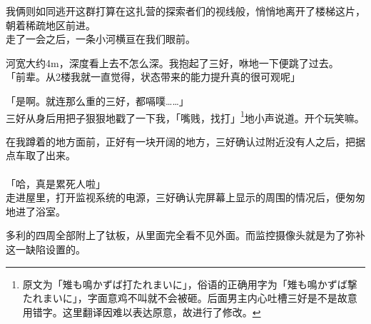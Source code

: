 我俩则如同逃开这群打算在这扎营的探索者们的视线般，悄悄地离开了楼梯这片，朝着稀疏地区前进。\\

走了一会之后，一条小河横亘在我们眼前。

河宽大约4m，深度看上去不怎么深。我抱起了三好，咻地一下便跳了过去。\\

「前辈。从2楼我就一直觉得，状态带来的能力提升真的很可观呢」

「是啊。就连那么重的三好，都嗝噗……」\\

三好从身后用把子狠狠地戳了一下我，「嘴贱，找打」\footnote{原文为「雉も鳴かずば打たれまいに」，俗语的正确用字为「雉も鳴かずば撃たれまいに」，字面意鸡不叫就不会被砸。后面男主内心吐槽三好是不是故意用错字。这里翻译因难以表达原意，故进行了修改。}地小声说道。开个玩笑嘛。

在我蹲着的地方面前，正好有一块开阔的地方，三好确认过附近没有人之后，把据点车取了出来。\\

\sqsplit\\

「哈，真是累死人啦」\\

走进屋里，打开监视系统的电源，三好确认完屏幕上显示的周围的情况后，便匆匆地进了浴室。

多利的四周全部附上了钛板，从里面完全看不见外面。而监控摄像头就是为了弥补这一缺陷设置的。\\

